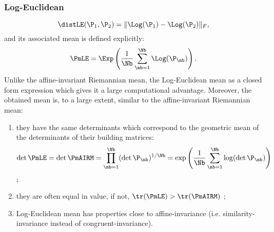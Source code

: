 \subsubsection{Log-Euclidean}
\iflatexml\else {} \fi
\begin{equation}
\distLE(\P_1, \P_2) = \lVert \Log(\P_1)-\Log(\P_2) \rVert_F ,
\label{eq:dist_LE}
\end{equation}
and its associated mean is defined explicitly:
\begin{equation}
\PmLE = \Exp \left( \frac{1}{\Nb} \sum_{\nb=1}^{\Nb} \Log(\P_\nb) \right) .
\label{eq:mean_LE}
\end{equation}
Unlike the affine-invariant Riemannian mean, the Log-Euclidean mean as a closed form expression which gives it a large computational advantage. 
Moreover, the obtained mean is, to a large extent, similar to the affine-invariant Riemannian mean:
\begin{enumerate}[label=(\roman*)]
\item they have the same determinants which correspond to the geometric mean of the determinants of their building matrices: \[ \det \PmLE = \det \PmAIRM  = \prod_{\nb=1}^{\Nb} (\det \P_\nb)^{1/\Nb} = \exp \left( \frac{1}{\Nb} \sum_{\nb=1}^{\Nb} \log( \det \P_\nb) \right) \] ;
\item they are often equal in value, if not, $\tr (\PmLE) > \tr (\PmAIRM)$ ;
\item Log-Euclidean mean has properties close to affine-invariance (i.e. similarity-invariance instead of congruent-invariance).
\end{enumerate}

